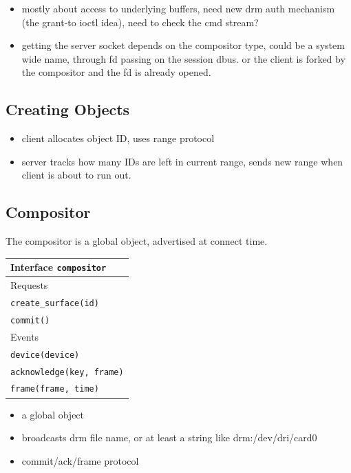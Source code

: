 \documentclass{article}
\begin{document}
\begin{itemize}
\item mostly about access to underlying buffers, need new drm auth
  mechanism (the grant-to ioctl idea), need to check the cmd stream?

\item getting the server socket depends on the compositor type, could
  be a system wide name, through fd passing on the session dbus. or
  the client is forked by the compositor and the fd is already opened.
\end{itemize}

\subsection{Creating Objects}

\begin{itemize}
\item client allocates object ID, uses range protocol
\item server tracks how many IDs are left in current range, sends new
  range when client is about to run out.
\end{itemize}

\subsection{Compositor}

The compositor is a global object, advertised at connect time.

\begin{tabular}{l}
  \hline 
  Interface \texttt{compositor} \\ \hline 
  Requests \\ \hline 
  \texttt{create\_surface(id)} \\
  \texttt{commit()} \\ \hline
  Events \\ \hline
  \texttt{device(device)} \\
  \texttt{acknowledge(key, frame)} \\
  \texttt{frame(frame, time)} \\ \hline
\end{tabular}


\begin{itemize}
\item a global object
\item broadcasts drm file name, or at least a string like drm:/dev/dri/card0
\item commit/ack/frame protocol
\end{itemize}
\end{document}
